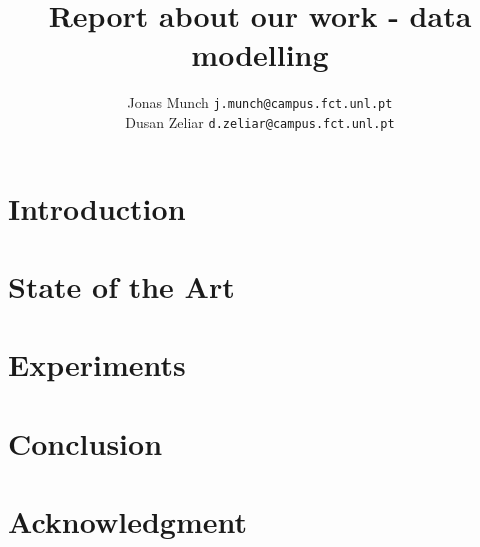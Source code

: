 \documentclass[letterpaper, 10 pt, conference]{ieeeconf}  %
\title{\LARGE \bf
Report about our work - data modelling
}
\author{
Jonas Munch {\tt\small j.munch@campus.fct.unl.pt} \\
Dusan Zeliar {\tt\small d.zeliar@campus.fct.unl.pt}
}
\begin{document}
\maketitle
\thispagestyle{empty}
\pagestyle{empty}



\begin{abstract}

\end{abstract}


\section{Introduction}
\label{sec:introduction}



\section{State of the Art}
\label{sec:related_work}



\section{Experiments}
\label{sec:experiments}



\section{Conclusion}
\label{sec:conclusion}



\addtolength{\textheight}{0cm}   %







\section*{Acknowledgment}





\end{document}
